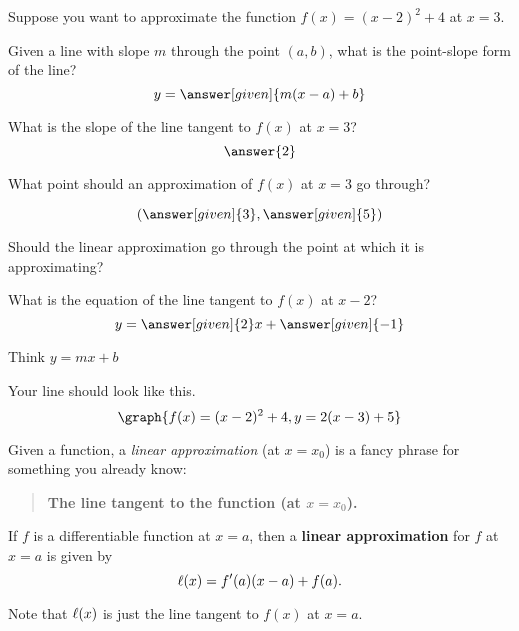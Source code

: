 \documentclass[handout,nooutcomes]{ximera}
\begin{document}
\begin{example}
Suppose you want to approximate the function $f(x) = (x-2)^2  + 4$ at $x=3$.

Given a line with slope $m$ through the point $(a, b)$, what is the point-slope form of the line?
\[
y = \answer[given]{m(x - a) + b}
\]

What is the slope of the line tangent to $f(x)$ at $x=3$?
\[
\answer{2}
\]

\begin{problem}
What point should an approximation of $f(x)$ at $x=3$ go through?

\[
(\answer[given]{3}, \answer[given]{5})
\]
\begin{hint}
Should the linear approximation go through the point at which it is approximating?
\end{hint}
\end{problem}

\begin{problem}
What is the equation of the line tangent to $f(x)$ at $x-2$?
\[
y = \answer[given]{2}x + \answer[given]{-1}
\]
\begin{hint}
Think $y=mx+b$
\end{hint}

\begin{feedback}
Your line should look like this.
\[
\graph{f(x) = (x-2)^2+4, y = 2(x-3) + 5}
\]
\end{feedback}
\end{problem}




Given a function, a \textit{linear approximation} (at $x=x_0$) is a fancy phrase
for something you already know:
\begin{center}
\begin{quote}
  \textbf{The line tangent to the function (at $x=x_0$).}
\end{quote}
\end{center}


\begin{definition}
If $f$ is a differentiable function at $x=a$, then a \textbf{linear
  approximation} for $f$ at $x=a$ is given by
\[
\ell(x) = f'(a)(x-a) +f(a).
\]
\end{definition}


Note that $\ell(x)$ is just the line tangent to $f(x)$ at $x=a$.



\end{example}
\end{document}
